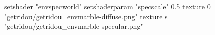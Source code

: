 setshader "envspecworld"
setshaderparam "specscale" 0.5
texture 0 "getridou/getridou_envmarble-diffuse.png"
texture s "getridou/getridou_envmarble-specular.png"
